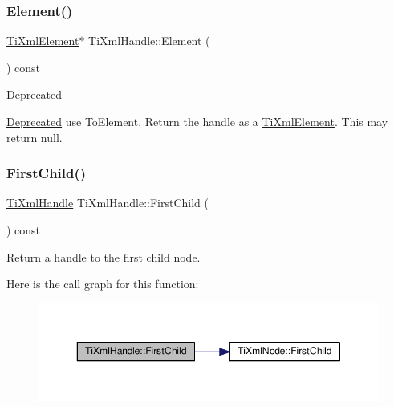 \subsubsection{\texorpdfstring{Element()}{Element()}}
{\footnotesize\ttfamily \hyperlink{class_ti_xml_element}{Ti\+Xml\+Element}$\ast$ Ti\+Xml\+Handle\+::\+Element (\begin{DoxyParamCaption}{ }\end{DoxyParamCaption}) const\hspace{0.3cm}{\ttfamily [inline]}}

\begin{DoxyRefDesc}{Deprecated}
\item[\hyperlink{deprecated__deprecated000002}{Deprecated}]use To\+Element. Return the handle as a \hyperlink{class_ti_xml_element}{Ti\+Xml\+Element}. This may return null. \end{DoxyRefDesc}
\mbox{\label{class_ti_xml_handle_afb1b4c0eda970b320dfd262304cc1d04}} 
\subsubsection{\texorpdfstring{First\+Child()}{FirstChild()}\hspace{0.1cm}{\footnotesize\ttfamily [1/2]}}
{\footnotesize\ttfamily \hyperlink{class_ti_xml_handle}{Ti\+Xml\+Handle} Ti\+Xml\+Handle\+::\+First\+Child (\begin{DoxyParamCaption}{ }\end{DoxyParamCaption}) const}



Return a handle to the first child node. 

Here is the call graph for this function\+:
\nopagebreak
\begin{figure}[H]
\begin{center}
\leavevmode
\includegraphics[width=350pt]{class_ti_xml_handle_afb1b4c0eda970b320dfd262304cc1d04_cgraph}
\end{center}
\end{figure}
\mbox{\label{class_ti_xml_handle_a586ebaca4a4d0909db65a765d95d5e59}} 
